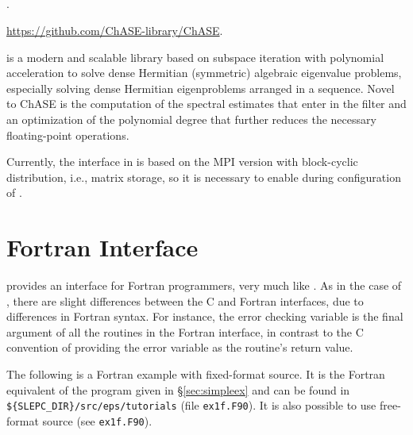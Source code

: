 \subsection*{\underline{\chase}}
\begin{description}
\setlength{\itemsep}{0pt}
\item[References.]\citep{Winkelmann:2019:CCA}.
\item[Website.] \url{https://github.com/ChASE-library/ChASE}.
\item[Summary.] \chase is a modern and scalable library based on subspace iteration with polynomial acceleration to solve dense Hermitian (symmetric) algebraic eigenvalue problems, especially solving dense Hermitian eigenproblems arranged in a sequence. Novel to ChASE is the computation of the spectral estimates that enter in the filter and an optimization of the polynomial degree that further reduces the necessary floating-point operations.
\item[Installation.] Currently, the \chase interface in \slepc is based on the MPI version with block-cyclic distribution, i.e., \scalapack matrix storage, so it is necessary to enable \scalapack during configuration of \petsc.
\end{description}

\section{Fortran Interface}
\label{sec:fortran}

\slepc provides an interface for Fortran programmers, very much like \petsc. As in the case of \petsc, there are slight differences between the C and Fortran \slepc interfaces, due to differences in Fortran syntax. For instance, the error checking variable is the final argument of all the routines in the Fortran interface, in contrast to the C convention of providing the error variable as the routine's return value.

The following is a Fortran example with fixed-format source. It is the Fortran equivalent of the program given in \S\ref{sec:simpleex} and can be found in \Verb!${SLEPC_DIR}/src/eps/tutorials! (file \texttt{ex1f.F90}). It is also possible to use free-format source (see \texttt{ex1f.F90}).

